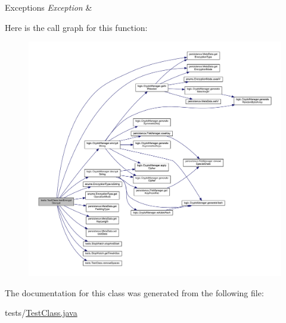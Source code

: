 \begin{DoxyExceptions}{Exceptions}
{\em Exception} & \\
\hline
\end{DoxyExceptions}
Here is the call graph for this function\+:\nopagebreak
\begin{figure}[H]
\begin{center}
\leavevmode
\includegraphics[width=350pt]{classtests_1_1_test_class_a11145228e7254b6763247dcdb84d1805_cgraph}
\end{center}
\end{figure}


The documentation for this class was generated from the following file\+:\begin{DoxyCompactItemize}
\item 
tests/\mbox{\hyperlink{_test_class_8java}{Test\+Class.\+java}}\end{DoxyCompactItemize}
